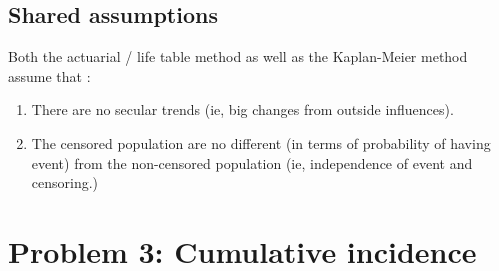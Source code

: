 \documentclass[12pt]{article}
\begin{document}
\subsection*{Shared assumptions}
Both the actuarial / life table method as well as the Kaplan-Meier method assume that : 
\begin{enumerate}
\item There are no secular trends (ie, big changes from outside influences).
\item The censored population are no different (in terms of probability of having event) from the non-censored population (ie, independence of event and censoring.) \\
\end{enumerate}

\newpage
\section*{Problem 3: Cumulative incidence}
\end{document}
